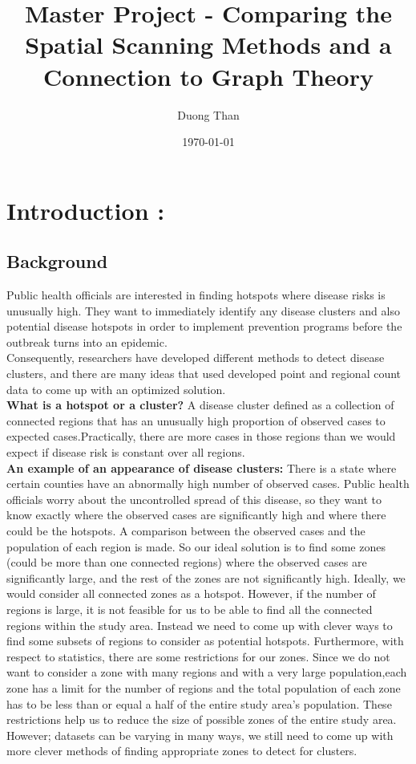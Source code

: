 \documentclass[12pt]{article}
\title{Master Project - Comparing the Spatial Scanning Methods and a Connection to Graph Theory  }
\author{Duong Than}
\date{\today}
\begin{document}
\maketitle	
	
		\section{Introduction :} 
		\subsection{Background} 

			Public health officials are interested in finding hotspots where disease risks is unusually high. They want to immediately identify any disease clusters and also potential disease hotspots in order to implement prevention programs before the outbreak turns into an epidemic. \\ 		
			
			Consequently, researchers have developed different methods to detect disease clusters, and there are many ideas that used developed point and regional count data to come up with an optimized solution. \\
			
			\textbf{What is a hotspot or a cluster?} A disease cluster defined as a collection of connected regions that has an unusually high proportion of observed cases to expected cases.Practically, there are more cases in those regions than we would expect if disease risk is constant over all regions.\\
			
			\textbf{An example of an appearance of disease clusters:} There is a state where certain counties  have an abnormally high number of observed cases. Public health officials worry about the uncontrolled spread of this disease, so they want to know exactly where the observed cases are significantly high and where there could be the hotspots. A comparison between the observed cases and the population of each region is made. So our ideal solution is to find some zones (could be more than one connected regions) where the observed cases are significantly large, and the rest of the zones are not significantly high. Ideally, we would consider all connected zones as a hotspot. However, if the number of regions is large, it is not feasible for us to be able to find all the connected regions within the study area. Instead we need to come up with clever ways to find some  subsets of regions to consider as potential hotspots. Furthermore, with respect to statistics, there are some restrictions for our zones. Since we do not want to consider a zone with many regions and with a very large population,each zone has a limit for the number of regions and the total population of each zone has to be less than or equal a half of the entire study area's population. These restrictions help us to reduce the size of possible zones of the entire study area. However; datasets can be varying in many ways, we still need to come up with more clever methods of finding appropriate zones to detect for clusters. \\       
			
\end{document}
